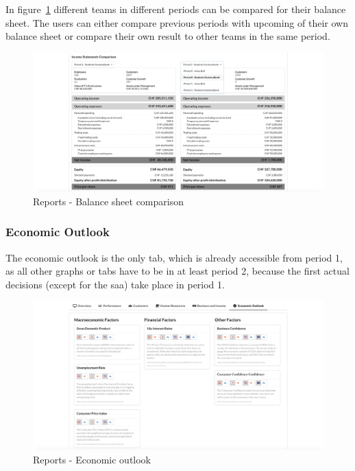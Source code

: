 In figure~\ref{fig:reports_balance_sheet_comparison} different teams in different periods can be compared for their balance sheet. The users can either compare previous periods with upcoming of their own balance sheet or compare their own result to other teams in the same period.
\begin{figure}[h!]
  \centering
  \includegraphics[scale=0.2]{img/application-overview/reports/05_business_income_balance_sheet_comparison.png}
  \caption{Reports - Balance sheet comparison}
  \label{fig:reports_balance_sheet_comparison}
\end{figure}


\subsubsection{Economic Outlook}
The economic outlook is the only tab, which is already accessible from period 1, as all other graphs or tabs have to be in at least period 2, because the first actual decisions (except for the saa) take place in period 1.
\begin{figure}[h!]
  \centering
  \includegraphics[scale=0.2]{img/application-overview/reports/06_economic_outlook.png}
  \caption{Reports - Economic outlook}
\end{figure}
